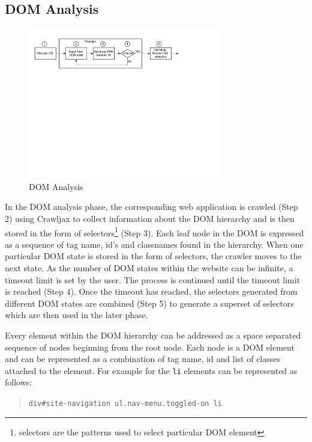 	\subsection{DOM Analysis}
	\label{Sec:DOM-Analysis}
		\begin{figure}
			\centering
			\includegraphics[width=85mm]{images/dom_analysis.pdf}
			\caption{DOM Analysis}
			\label{Fig:DOM-Analysis}
		\end{figure}
		In the DOM analysis phase, the corresponding web application is crawled (Step 2) using Crawljax \cite{crawljax:tweb12} to collect information about the DOM hierarchy and is then stored in the form of \css selectors\footnote{\css selectors are the patterns used to select particular DOM element} (Step 3). Each leaf node in the DOM is expressed as a sequence of tag name, id's and classnames found in the hierarchy. When one particular DOM state is stored in the form of \css selectors, the crawler moves to the next state. As the number of DOM states within the website can be infinite, a timeout limit is set by the user. The process is continued until the timeout limit is reached (Step 4). Once the timeout has reached, the \css selectors generated from different DOM states are combined (Step 5) to generate a superset of \css selectors which are then used in the later phase.
		
		Every element within the DOM hierarchy can be addressed as a space separated sequence of nodes beginning from the root node. Each node is a DOM element and can be represented as a combination of tag name, id and list of classes attached to the element. For example for  the \texttt{li} elements can be represented as follows:
			
		\begin{quote}
			\texttt{div\#site-navigation ul.nav-menu.toggled-on li}
		\end{quote}
			
